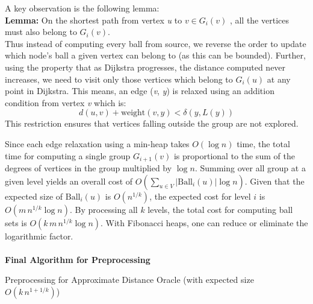 \documentclass{article}
\begin{document}
A key observation is the following lemma: \\
\textbf{Lemma: } On the shortest path from vertex \textit{u} to \(v \in G_i(v)\)  , all the vertices must also belong to \(G_i(v)\). \\

Thus instead of computing every ball from source, we reverse the order to update which node's ball a given vertex can belong to (as this can be bounded). Further, using the property that as Dijkstra progresses, the distance computed never increases, we need to visit only those vertices which belong to \(G_i(u)\) at any point in Dijkstra. This means, an edge (\textit{v}, \textit{y}) is relaxed using an addition condition from vertex \textit{v} which is:
\[
d(u, v) + \text{weight}(v, y) < \delta(y, L(y))
\]
This restriction ensures that vertices falling outside the group are not explored.

Since each edge relaxation using a min-heap takes \(O(\log n)\) time, the total time for computing a single group \(G_{i+1}(v)\) is proportional to the sum of the degrees of vertices in the group multiplied by \(\log n\). Summing over all group at a given level yields an overall cost of
\(
O\left(\sum_{u \in V} |\text{Ball}_i(u)| \log n\right).
\)
Given that the expected size of \(\text{Ball}_i(u)\) is \(O(n^{1/k})\), the expected cost for level \(i\) is \(O(m\,n^{1/k}\log n)\). By processing all \(k\) levels, the total cost for computing ball sets is \(O(k\,m\,n^{1/k}\log n)\). With Fibonacci heaps, one can reduce or eliminate the logarithmic factor.
\\\\
\textbf{Final Algorithm for Preprocessing}
\begin{algorithm}[H]
    \caption{Preprocessing for Approximate Distance Oracle (with expected size \(O(k\,n^{1+1/k})\))}
    \label{alg:preprocessing}
    \begin{algorithmic}[1]
        \State {}
            \State {}
        \EndFor
                    \State {}
                \EndIf
            \EndFor
        \EndFor

        \medskip

        \medskip
        
        \State {}
    \EndProcedure
    \end{algorithmic}
    \end{algorithm}
\end{document}
